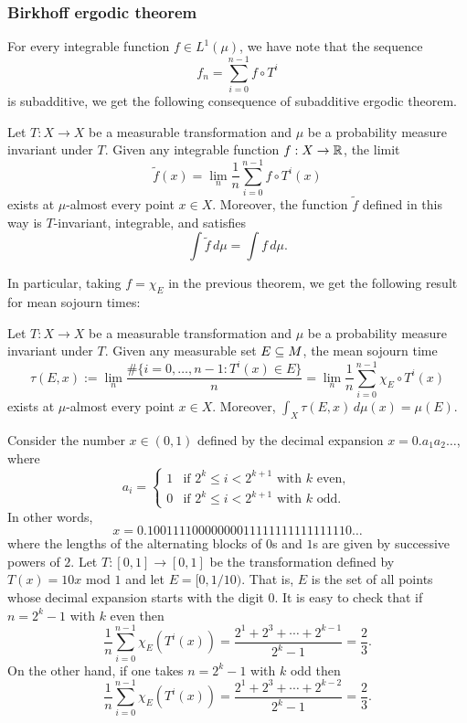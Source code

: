 \subsubsection{Birkhoff ergodic theorem}
For every integrable function $f\in L^1(\mu)$, we have note that the sequence
\[f_n=\sum_{i=0}^{n-1}f\circ T^i\]
is subadditive, we get the following consequence of subadditive ergodic theorem.
\begin{theorem}
Let $T:X\to X$ be a measurable transformation and $\mu$ be a probability measure invariant under $T$. Given any integrable function $f:X\to\mathbb{R}$, the limit
\[\tilde{f}(x)=\lim_{n}\frac{1}{n}\sum_{i=0}^{n-1}f\circ T^i(x)\]
exists at $\mu$-almost every point $x\in X$. Moreover, the function $\tilde{f}$ defined in this way is $T$-invariant, integrable, and satisfies
\[\int\tilde{f}\,d\mu=\int f\,d\mu.\]
\end{theorem}
In particular, taking $f=\chi_E$ in the previous theorem, we get the following result for mean sojourn times:
\begin{theorem}
Let $T:X\to X$ be a measurable transformation and $\mu$ be a probability measure invariant under $T$. Given any measurable set $E\subseteq M$, the mean sojourn time
\[\tau(E,x):=\lim_n\frac{\#\{i=0,\dots,n-1:T^i(x)\in E\}}{n}=\lim_n\frac{1}{n}\sum_{i=0}^{n-1}\chi_E\circ T^i(x)\]
exists at $\mu$-almost every point $x\in X$. Moreover, $\int_X\tau(E,x)\,d\mu(x)=\mu(E)$.
\end{theorem}
\begin{example}
Consider the number $x\in(0,1)$ defined by the decimal expansion $x=0.a_1a_2\dots$, where
\[a_i=\begin{cases}
1&\text{if $2^k\leq i<2^{k+1}$ with $k$ even},\\
0&\text{if $2^k\leq i<2^{k+1}$ with $k$ odd}.
\end{cases}\]
In other words,
\[x=0.10011110000000011111111111111110\dots\]
where the lengths of the alternating blocks of $0$s and $1$s are given by successive powers of $2$. Let $T:[0,1]\to[0,1]$ be the transformation defined by $T(x)=10x$ mod $1$ and let $E=[0,1/10)$. That is, $E$ is the set of all points whose decimal expansion starts with the digit $0$. It is easy to check that if $n=2^k-1$ with $k$ even then
\[\frac{1}{n}\sum_{i=0}^{n-1}\chi_E(T^i(x))=\frac{2^1+2^3+\cdots+2^{k-1}}{2^k-1}=\frac{2}{3}.\]
On the other hand, if one takes $n=2^k-1$ with $k$ odd then
\[\frac{1}{n}\sum_{i=0}^{n-1}\chi_E(T^i(x))=\frac{2^1+2^3+\cdots+2^{k-2}}{2^k-1}=\frac{2}{3}.\]
\end{example}
